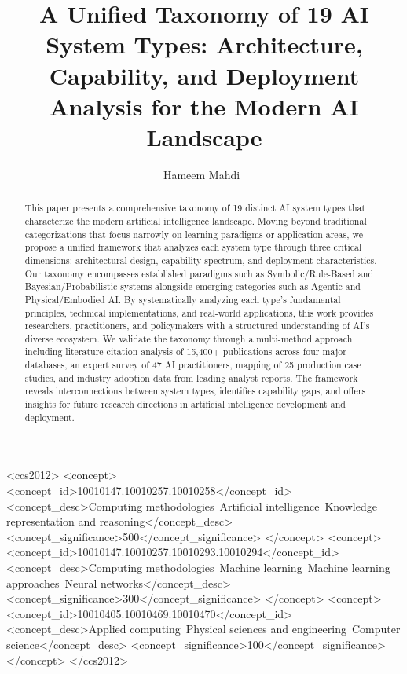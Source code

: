 \documentclass[acmlarge]{acmart}
\newcommand{\orcidicon}[1]{\texorpdfstring{\href{https://orcid.org/#1}{\mbox{\textcolor[RGB]{166,206,57}{\Large\textbullet}}}}{ORCID}}
\begin{document}
\title{A Unified Taxonomy of 19 AI System Types: Architecture, Capability, and Deployment Analysis for the Modern AI Landscape}

\author{Hameem Mahdi~\orcidicon{0009-0007-0005-3080}}

\renewcommand{\shortauthors}{H. Mahdi}

\begin{abstract}
This paper presents a comprehensive taxonomy of 19 distinct AI system types that characterize the modern artificial intelligence landscape. Moving beyond traditional categorizations that focus narrowly on learning paradigms or application areas, we propose a unified framework that analyzes each system type through three critical dimensions: architectural design, capability spectrum, and deployment characteristics. Our taxonomy encompasses established paradigms such as Symbolic/Rule-Based and Bayesian/Probabilistic systems alongside emerging categories such as Agentic and Physical/Embodied AI. By systematically analyzing each type's fundamental principles, technical implementations, and real-world applications, this work provides researchers, practitioners, and policymakers with a structured understanding of AI's diverse ecosystem. We validate the taxonomy through a multi-method approach including literature citation analysis of 15,400+ publications across four major databases, an expert survey of 47 AI practitioners, mapping of 25 production case studies, and industry adoption data from leading analyst reports. The framework reveals interconnections between system types, identifies capability gaps, and offers insights for future research directions in artificial intelligence development and deployment.
\end{abstract}

\begin{CCSXML}
<ccs2012>
 <concept>
  <concept_id>10010147.10010257.10010258</concept_id>
  <concept_desc>Computing methodologies~Artificial intelligence~Knowledge representation and reasoning</concept_desc>
  <concept_significance>500</concept_significance>
 </concept>
 <concept>
  <concept_id>10010147.10010257.10010293.10010294</concept_id>
  <concept_desc>Computing methodologies~Machine learning~Machine learning approaches~Neural networks</concept_desc>
  <concept_significance>300</concept_significance>
 </concept>
 <concept>
  <concept_id>10010405.10010469.10010470</concept_id>
  <concept_desc>Applied computing~Physical sciences and engineering~Computer science</concept_desc>
  <concept_significance>100</concept_significance>
 </concept>
</ccs2012>
\end{CCSXML}
\end{document}

